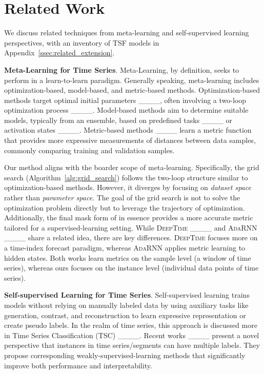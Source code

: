 \section{Related Work}

We discuss related techniques from meta-learning and self-supervised learning perspectives, with an inventory of TSF models in Appendix~\ref{ssec:related_extension}.

\textbf{Meta-Learning for Time Series}.
Meta-Learning, by definition, seeks to perform in a learn-to-learn paradigm. Generally speaking, meta-learning includes optimization-based, model-based, and metric-based methods. Optimization-based methods target optimal initial parameters ____, often involving a two-loop optimization process ____. Model-based methods aim to determine suitable models, typically from an ensemble, based on predefined tasks ____ or activation states ____. 
Metric-based methods ____ learn a metric function that provides more expressive measurements of distances between data samples, commonly comparing training and validation samples. 

Our method \model{} aligns with the boarder scope of meta-learning. 
Specifically, the grid search (Algorithm~\ref{alg:grid_search}) follows the two-loop structure similar to optimization-based methods. However, it diverges by focusing on \emph{dataset space} rather than \emph{parameter space}.
The goal of the grid search is not to solve the optimization problem directly but to leverage the trajectory of optimization.
Additionally, the final mask form of \model{} in essence provides a more accurate metric tailored for a supervised-learning setting. 
%
While \textsc{DeepTime} ____ and \textsc{AdaRNN} ____ share a related idea, there are key differences. 
\textsc{DeepTime} focuses more on a time-index forecast paradigm, whereas \textsc{AdaRNN} applies metric learning to hidden states. 
Both works learn metrics on the sample level (a window of time series), whereas ours focuses on the instance level (individual data points of time series).

\textbf{Self-supervised Learning for Time Series}.
Self-supervised learning trains models without relying on manually labeled data by using auxiliary tasks like generation, contrast, and reconstruction to learn expressive representation or create pseudo labels. 
%
In the realm of time series, this approach is discussed more in Time Series Classification (TSC) ____. 
Recent works ____ present a novel perspective that instances in time series/segments can have multiple labels. 
They propose corresponding weakly-supervised-learning methods that significantly improve both performance and interpretability. 

